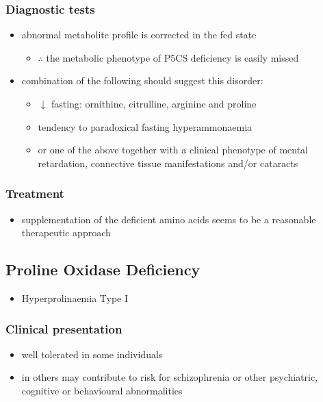 \documentclass{scrartcl}
\begin{document}
\subsubsection{Diagnostic tests}
\label{sec:org7b241b1}
\begin{itemize}
\item abnormal metabolite profile is corrected in the fed state
\begin{itemize}
\item \(\therefore\) the metabolic phenotype of P5CS deficiency is easily
missed
\end{itemize}
\item combination of the following should suggest this disorder:
\begin{itemize}
\item \(\downarrow\) fasting: ornithine, citrulline, arginine and proline
\item tendency to paradoxical fasting hyperammonaemia
\item or one of the above together with a clinical phenotype of mental
retardation, connective tissue manifestations and/or cataracts
\end{itemize}
\end{itemize}

\subsubsection{Treatment}
\label{sec:org07c8eb9}
\begin{itemize}
\item supplementation of the deficient amino acids seems to be a
reasonable therapeutic approach
\end{itemize}

\subsection{Proline Oxidase Deficiency}
\label{sec:orga78ca69}
\begin{itemize}
\item Hyperprolinaemia Type I
\end{itemize}
\subsubsection{Clinical presentation}
\label{sec:org562214c}
\begin{itemize}
\item well tolerated in some individuals
\item in others may contribute to risk for schizophrenia or other
psychiatric, cognitive or behavioural abnormalities
\end{itemize}
\end{document}
